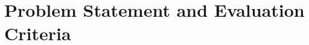 \documentclass{llncs}
\begin{document}
%
%
%
%
%
%

\section{Problem Statement and Evaluation Criteria}
\end{document}
